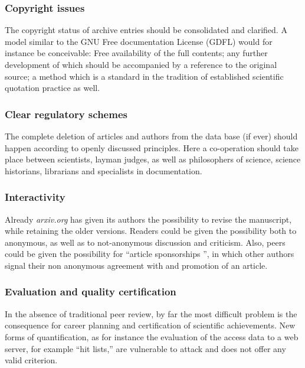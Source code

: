 \subsubsection{Copyright issues}

The copyright status of archive entries should be consolidated and
clarified.
A model similar to the GNU
Free documentation License (GDFL) would for instance be conceivable:
 Free availability of the full
contents; any further development of which should be accompanied by a
reference to the original source; a method  which is a standard in the
tradition of established scientific quotation practice as well.


\subsubsection{Clear regulatory schemes}

The complete deletion of articles and authors from the data base (if ever) should
happen according to openly discussed principles.  Here a co-operation
should take place between scientists, layman judges, as well as
philosophers of science, science historians, librarians and specialists
in documentation.


\subsubsection{Interactivity}

Already {\it arxiv.org} has given its authors the possibility to revise
the manuscript, while retaining the older versions.  Readers could be
given the possibility both to anonymous, as well as to not-anonymous
discussion and criticism.  Also, peers could be given the possibility
for ``article sponsorships '', in which other authors signal
their non anonymous agreement with and promotion of an article.


\subsubsection{Evaluation and quality certification}

In the absence of traditional peer review, by far the most
difficult problem is the consequence for career planning and
certification of scientific achievements.  New forms of quantification,
as for instance the evaluation of the access data to a web server, for
example ``hit lists,'' are vulnerable to attack and does not offer any valid criterion.

